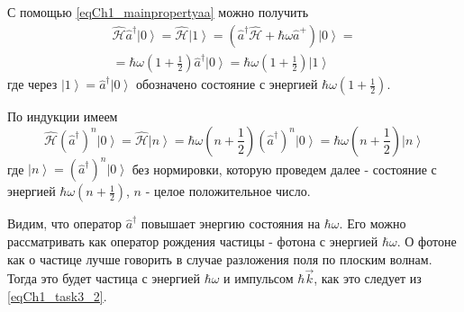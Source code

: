 С помощью \eqref{eqCh1_mainpropertyaa} можно получить
\begin{eqnarray}
\hat{\mathcal{H}} \hat{a}^{\dag}\left|0\right> = 
\hat{\mathcal{H}} \left|1\right> =
\left(\hat{a}^{\dag} \hat{\mathcal{H}} + \hbar \omega \hat{a}^{+} \right)
\left|0\right> = 
\nonumber \\
= \hbar \omega \left(1 + \frac{1}{2}\right)
\hat{a}^{\dag} \left|0\right> = 
\hbar \omega \left(1 + \frac{1}{2}\right)
\left|1\right>
\end{eqnarray}
где через $\left|1\right> = \hat{a}^{\dag} \left|0\right>$ обозначено
состояние с энергией $\hbar \omega \left(1 + \frac{1}{2}\right)$.

По индукции имеем
\begin{equation}
\hat{\mathcal{H}} \left(\hat{a}^{\dag}\right)^n\left|0\right> = 
\hat{\mathcal{H}} \left|n\right> 
= \hbar \omega \left(n + \frac{1}{2}\right)
\left(\hat{a}^{\dag}\right)^n\left|0\right> = 
\hbar \omega \left(n + \frac{1}{2}\right)
\left|n\right>
\label{eqCh1_aplusinduction}
\end{equation}
где
$\left|n\right> = \left(\hat{a}^{\dag}\right)^n\left|0\right>$   
без нормировки, которую проведем далее -  состояние с энергией  
$\hbar \omega \left(n + \frac{1}{2}\right)$,  $n$  -  целое
положительное число.

Видим, что оператор  $\hat{a}^{\dag}$  повышает энергию состояния на
$\hbar \omega$.  Его можно рассматривать как оператор рождения частицы
- фотона  с энергией  $\hbar \omega$.  О фотоне как о частице лучше
говорить в случае разложения поля по плоским волнам. Тогда это будет
частица с энергией $\hbar \omega$ и импульсом $\hbar \vec{k}$,  как
это следует из \eqref{eqCh1_task3_2}. 
  
